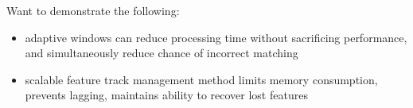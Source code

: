 Want to demonstrate the following:

\begin{itemize}
	\item adaptive windows can reduce processing time without sacrificing performance, and simultaneously reduce chance of incorrect matching
	\item scalable feature track management method limits memory consumption, prevents lagging, maintains ability to recover lost features
\end{itemize}